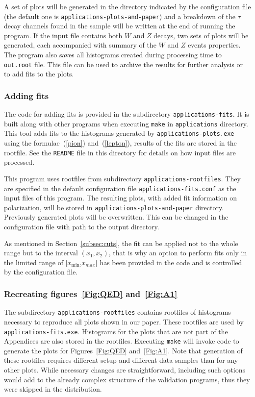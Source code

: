 \documentclass{article}
\begin{document}
A set of plots will be generated in the directory indicated by the configuration file
(the default one is {\tt applications-plots-\-and-paper})
and a breakdown of the $\tau$ decay channels found in the sample will be written
at the end of running the program. If the input file contains both $W$ and $Z$
decays, two sets of plots will be generated, each accompanied with summary of the $W$ and $Z$ events  properties.  The
program also saves all histograms created during processing time to {\tt out.root} file. 
This file can be used to archive the results for further analysis or to add
fits to the plots.

\subsubsection{Adding fits}

The code for adding fits is provided in the subdirectory {\tt applications-fits}.
It is built along with other programs when executing {\tt make} in {\tt applications} directory.
This tool adds fits to the histograms generated by
{\tt applications-plots.exe}
using the formulae~(\ref{pion}) and~(\ref{lepton}), results of the fits are 
stored in the rootfile. See the {\tt README} file in this directory
for details on how input files are processed.

This program uses rootfiles from subdirectory {\tt applications-rootfiles}.
They are specified in the default configuration file {\tt app\-li\-cat\-ions-fits.conf} as the input files of this program.
The resulting plots, with added fit information on polarization, will be stored in
{\tt applications-plots-and-paper} directory. Previously generated plots will be overwritten.
This can be changed in the configuration file with path to the output directory.

As mentioned in Section~\ref{subsec:cuts}, the fit can be applied not to the whole
range but to the interval $(x_1,x_2)$, that is why an option to perform fits only in the limited range of [$x_{\min}$,$x_{max}$]
has been provided in the code and is controlled by the
configuration file.

\subsubsection{Recreating figures~\ref{Fig:QED} and~\ref{Fig:A1}}

The subdirectory {\tt applications-rootfiles} contains rootfiles of 
histograms necessary to reproduce all plots shown in our paper.
These rootfiles are used by {\tt applications-fits.exe}. Histograms
for the plots that are not part of the Appendices are also stored in the 
rootfiles.
Executing {\tt make} will invoke code to generate the plots for Figures~\ref{Fig:QED} and~\ref{Fig:A1}.
Note that generation of these rootfiles requires different setup and different data samples than for any other plots.
While necessary changes are straightforward, including such options would add to the already complex
structure of the validation programs, thus they were skipped in the distribution.
\end{document}
